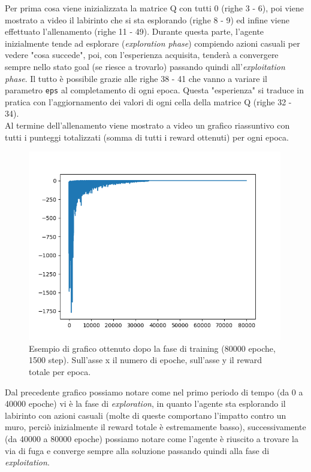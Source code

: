 Per prima cosa viene inizializzata la matrice Q con tutti 0 (righe 3 - 6), poi viene mostrato a video il labirinto che si sta esplorando (righe 8 - 9) ed infine viene effettuato l'allenamento (righe 11 - 49). Durante questa parte, l'agente inizialmente tende ad esplorare (\textit{exploration phase}) compiendo azioni casuali per vedere "cosa succede", poi, con l'esperienza acquisita, tender\`{a} a convergere sempre nello stato goal (se riesce a trovarlo) passando quindi all'\textit{exploitation phase}. Il tutto \`{e} possibile grazie alle righe 38 - 41 che vanno a variare il parametro \lstinline[style=cmd]|eps| al completamento di ogni epoca. Questa "esperienza" si traduce in pratica con l'aggiornamento dei valori di ogni cella della matrice Q (righe 32 - 34).\\

Al termine dell'allenamento viene mostrato a video un grafico riassuntivo con tutti i punteggi totalizzati (somma di tutti i reward ottenuti) per ogni epoca.\\

\begin{figure}[H]
	\centering
	\includegraphics[width=30em]{img/esempio_plot.png}
	\caption{Esempio di grafico ottenuto dopo la fase di training (80000 epoche, 1500 step). Sull'asse x il numero di epoche, sull'asse y il reward totale per epoca.}
\end{figure}

Dal precedente grafico possiamo notare come nel primo periodo di tempo (da 0 a 40000 epoche) vi \`{e} la fase di \textit{exploration}, in quanto l'agente sta esplorando il labirinto con azioni casuali (molte di queste comportano l'impatto contro un muro, perci\`{o} inizialmente il reward totale \`{e} estremamente basso), successivamente (da 40000 a 80000 epoche) possiamo notare come l'agente \`{e} riuscito a trovare la via di fuga e converge sempre alla soluzione passando quindi alla fase di \textit{exploitation}.\\

